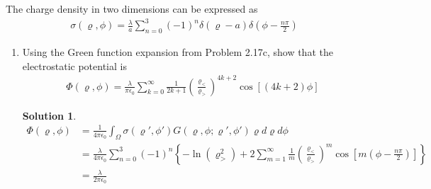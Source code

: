 \documentclass[letter,12pt]{article}
\theoremstyle{definition}
\newtheorem*{sol}{Solution}
\begin{document}
\begin{enumerate}
\begin{figure}[H]
          \end{figure}
            The charge density in two dimensions can be expressed as
            \begin{align*}
                \sigma(\varrho, \phi) =
                \frac{\lambda}{a}
                \sum_{n=0}^3 {\left(-1\right)}^n \delta(\varrho - a) \delta\left(\phi - \frac{n \pi}{2}\right)
            \end{align*}
            \begin{enumerate}
                \item
                    Using the Green function expansion from Problem 2.17c, show that the electrostatic potential is
                    \begin{align*}
                        \Phi(\varrho, \phi) =
                        \frac{\lambda}{\pi \epsilon_0}
                        \sum_{k=0}^\infty \frac{1}{2 k + 1}
                        {\left(
                            \frac{\varrho_<}{\varrho_>}
                        \right)}^{4k + 2}
                        \cos\left[(4k + 2) \phi \right]
                    \end{align*}
                    \begin{sol}
                        \begin{align*}
                            \Phi(\varrho, \phi) &= \frac{1}{4 \pi \epsilon_0}\int_\Omega
                            \sigma(\varrho', \phi')G(\varrho, \phi; \varrho', \phi') \varrho d\varrho d\phi
                            \\
                            &= \frac{\lambda}{4 \pi \epsilon_0}
                            \sum_{n = 0}^{3}{(-1)}^n
                            \left\{
                                -\ln(\varrho_>^2) +
                                2 \sum_{m = 1}^{\infty}\frac{1}{m}
                                {\left(
                                    \frac{\varrho_<}{\varrho_>}
                                \right)}^m
                                \cos\left[m (\phi - \frac{n \pi}{2})\right]
                            \right\}
                            \\
                            &= \frac{\lambda}{2 \pi \epsilon_0}

\end{align*}
\end{sol}
\end{enumerate}
\end{enumerate}
\end{document}
